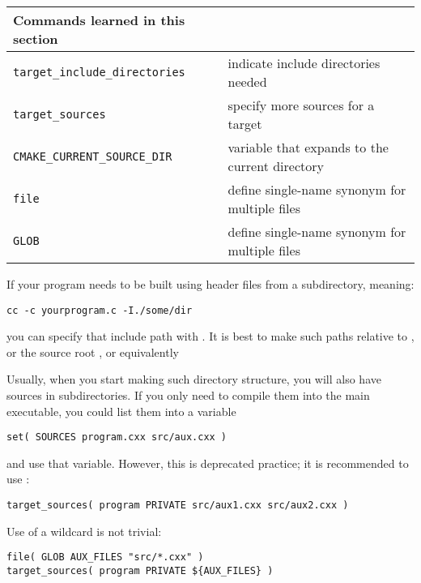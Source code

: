 \begin{tabular}{lp{3in}}
  \toprule
  Commands learned in this section\\
  \midrule
  \lstinline+target_include_directories+&indicate include directories needed\\
  \lstinline+target_sources+&specify more sources for a target\\
  \lstinline+CMAKE_CURRENT_SOURCE_DIR+&variable that expands to the current directory\\
  \lstinline+file+&define single-name synonym for multiple files\\
  \lstinline+GLOB+&define single-name synonym for multiple files\\
  \bottomrule
\end{tabular}

\begin{floatingfigure}[r]{2.5in}
  \begin{minipage}{2.5in}
  \end{minipage}
\end{floatingfigure}
%
If your program needs to be built using header files from a subdirectory,
meaning:
\begin{verbatim}
cc -c yourprogram.c -I./some/dir
\end{verbatim}
you can specify that include path with .
It is best to make such paths relative to
,
or the source root ,
or equivalently 

\begin{floatingfigure}[r]{2.5in}\vskip3in\end{floatingfigure}
%
Usually, when you start making such directory structure,
you will also have sources in subdirectories.
If you only need to compile them into the main executable,
you could list them into a variable
\begin{lstlisting}
set( SOURCES program.cxx src/aux.cxx )
\end{lstlisting}
and use that variable.
However, this is deprecated practice;
it is recommended to use :
\begin{lstlisting}
target_sources( program PRIVATE src/aux1.cxx src/aux2.cxx )
\end{lstlisting}
Use of a wildcard is not trivial:
\begin{lstlisting}
file( GLOB AUX_FILES "src/*.cxx" )
target_sources( program PRIVATE ${AUX_FILES} )
\end{lstlisting}

